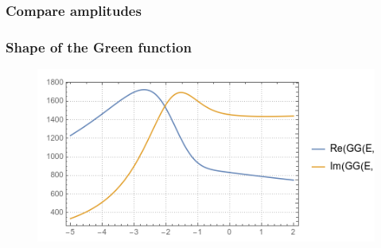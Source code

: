 \documentclass[8pt,dvipsnames,table]{beamer}
\begin{document}
\begin{frame}
	\frametitle{Compare amplitudes}

	
	

\end{frame}

\begin{frame}
	\frametitle{Shape of the Green function}

	\begin{figure}[!htb]
		\centering
		\includegraphics[width=\linewidth]{image43.png}
		\label{fig:image43}
	\end{figure}

\end{frame}
\end{document}
